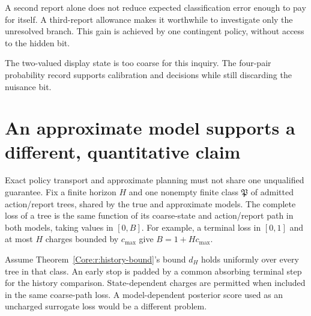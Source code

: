 A second report alone does not reduce expected classification error enough to pay for itself. A third-report allowance makes it worthwhile to investigate only the unresolved branch. This gain is achieved by one contingent policy, without access to the hidden bit.



The two-valued display state is too coarse for this inquiry. The four-pair probability record supports calibration and decisions while still discarding the nuisance bit.

\section{An approximate model supports a different, quantitative claim}
Exact policy transport and approximate planning must not share one unqualified guarantee. Fix a finite horizon $H$ and one nonempty finite class $\mathfrak P$ of admitted action/report trees, shared by the true and approximate models. The complete loss of a tree is the same function of its coarse-state and action/report path in both models, taking values in $[0,B]$. For example, a terminal loss in $[0,1]$ and at most $H$ charges bounded by $c_{\max}$ give $B=1+Hc_{\max}$.

Assume Theorem~\ref{Core:r:history-bound}'s bound $d_H$ holds uniformly over every tree in that class. An early stop is padded by a common absorbing terminal step for the history comparison. State-dependent charges are permitted when included in the same coarse-path loss. A model-dependent posterior score used as an uncharged surrogate loss would be a different problem.

